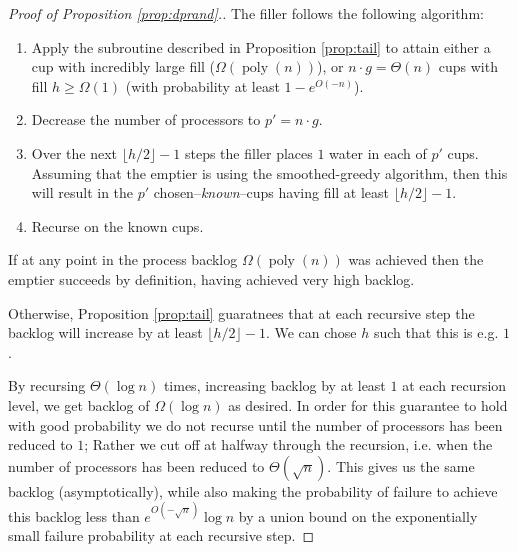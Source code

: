 \documentclass{article}[11pt]
\DeclareMathOperator{\poly}{\text{poly}}
\begin{document}
\begin{proof}[Proof of Proposition \ref{prop:dprand}.]
  The filler follows the following algorithm:
  \begin{enumerate}
    \item Apply the subroutine described in Proposition \ref{prop:tail} to
      attain either a cup with incredibly large fill ($\Omega(\poly(n))$), or
      $n\cdot g = \Theta(n)$ cups with fill $h \ge \Omega(1)$ (with probability
      at least $1-e^{O(-n)}$).
    \item Decrease the number of processors to $p' = n\cdot g$. 
    \item Over the next $\lfloor h/2 \rfloor - 1$ steps the filler places $1$
      water in each of $p'$ cups. Assuming that the emptier is using the
      smoothed-greedy algorithm, then this will result in the $p'$
      chosen--\emph{known}--cups having fill at least $\lfloor h/2 \rfloor -1$.
    \item Recurse on the known cups. 
  \end{enumerate}
  If at any point in the process backlog $\Omega(\poly(n))$ was achieved then
  the emptier succeeds by definition, having achieved very high backlog.

  Otherwise, Proposition \ref{prop:tail} guaratnees that at each recursive step
  the backlog will increase by at least $\lfloor h/2\rfloor-1$. We can chose
  $h$ such that this is e.g. $1$.

  By recursing $\Theta(\log n)$ times, increasing backlog by at least $1$ at
  each recursion level, we get backlog of $\Omega(\log n)$ as desired.
  In order for this guarantee to hold with good probability we do not recurse
  until the number of processors has been reduced to $1$; Rather we cut off at 
  halfway through the recursion, i.e. when the number of processors has been
  reduced to $\Theta(\sqrt{n})$. This gives us the same backlog (asymptotically), 
  while also making the probability of failure to achieve this backlog less than
  $e^{O(-\sqrt{n})}\log n$ by a union bound on the exponentially small failure
  probability at each recursive step.
\end{proof}
\end{document}
